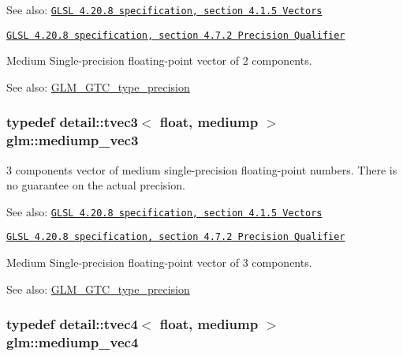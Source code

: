 \begin{Desc}
\item[See also:]\href{http://www.opengl.org/registry/doc/GLSLangSpec.4.20.8.pdf}{\tt GLSL 4.20.8 specification, section 4.1.5 Vectors} 

\href{http://www.opengl.org/registry/doc/GLSLangSpec.4.20.8.pdf}{\tt GLSL 4.20.8 specification, section 4.7.2 Precision Qualifier}\end{Desc}
Medium Single-precision floating-point vector of 2 components. \begin{Desc}
\item[See also:]\hyperlink{group__gtc__type__precision}{GLM\_\-GTC\_\-type\_\-precision} \end{Desc}
\hypertarget{group__core__precision_g10acc767a046b85205f52ce7f834626f}{
\subsubsection[mediump\_\-vec3]{\setlength{\rightskip}{0pt plus 5cm}typedef detail::tvec3$<$ float, mediump $>$ {\bf glm::mediump\_\-vec3}}}
\label{group__core__precision_g10acc767a046b85205f52ce7f834626f}


3 components vector of medium single-precision floating-point numbers. There is no guarantee on the actual precision.

\begin{Desc}
\item[See also:]\href{http://www.opengl.org/registry/doc/GLSLangSpec.4.20.8.pdf}{\tt GLSL 4.20.8 specification, section 4.1.5 Vectors} 

\href{http://www.opengl.org/registry/doc/GLSLangSpec.4.20.8.pdf}{\tt GLSL 4.20.8 specification, section 4.7.2 Precision Qualifier}\end{Desc}
Medium Single-precision floating-point vector of 3 components. \begin{Desc}
\item[See also:]\hyperlink{group__gtc__type__precision}{GLM\_\-GTC\_\-type\_\-precision} \end{Desc}
\hypertarget{group__core__precision_g2527a7f322907fecd58bef0a7a9c3ecd}{
\subsubsection[mediump\_\-vec4]{\setlength{\rightskip}{0pt plus 5cm}typedef detail::tvec4$<$ float, mediump $>$ {\bf glm::mediump\_\-vec4}}}
\label{group__core__precision_g2527a7f322907fecd58bef0a7a9c3ecd}


